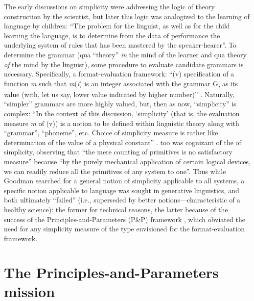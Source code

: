 \documentclass[output=paper]{langsci/langscibook}
\begin{document}
The early discussions on simplicity were addressing the logic of theory
construction by the scientist, but later \citep[4]{Chomsky1965} this logic was
analogized to the learning of language by children: “The problem for the
linguist, as well as for the child learning the language, is to determine from
the data of performance the underlying system of rules that has been mastered
by the speaker-hearer”. To determine the grammar (qua “theory” \emph{in} the
mind of the learner and qua theory \emph{of} the mind by the linguist), some
procedure to evaluate candidate grammars is necessary. Specifically, a
format-evaluation framework: “(v) specification of a function \emph{m} such
that \emph{m}(\emph{i}) is an integer associated with the grammar
G\emph{\textsubscript{i}} as its value (with, let us say, lower value indicated
by higher number)” \parencite[31]{Chomsky1965}. Naturally, “simpler” grammars are more
highly valued, but, then as now, “simplicity” is complex: “In the context of
this discussion, ‘simplicity’ (that is, the evaluation measure \emph{m} of (v))
is a notion to be defined within linguistic theory along with \enquote{grammar},
\enquote{phoneme}, etc. Choice of simplicity measure is rather like determination of
the value of a physical constant” \parencite[37--38]{Chomsky1965}.
\citet[107--108]{Goodman1943} too was cognizant of the  of simplicity,
observing that “the mere counting of primitives is no satisfactory measure”
because “by the purely mechanical application of certain logical devices, we
can readily reduce all the primitives of any system to one”. Thus while Goodman
searched for a general notion of simplicity applicable to all systems, a
specific notion applicable to language was sought in generative linguistics,
and both ultimately “failed” (i.e., superseded by better notions—characteristic
of a healthy science): the former for technical reasons, the latter because of
the success of the Principles-and-Parameters (P\&P) framework
\citep{Chomsky1981}, which obviated the need for any simplicity measure of the
type envisioned for the format-evaluation framework.

\section{The Principles-and-Parameters mission}
\end{document}
